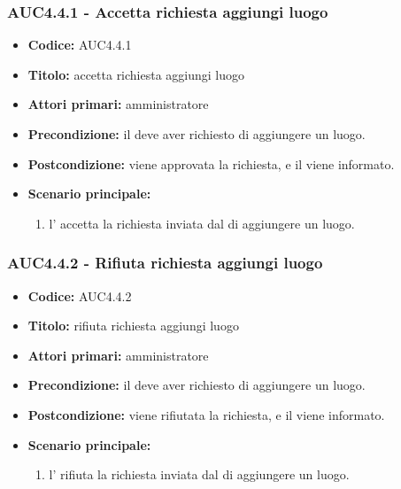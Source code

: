 \documentclass[casi-duso]{subfiles}
\begin{document}
\subsubsection{AUC4.4.1 - Accetta richiesta aggiungi luogo}%
\label{subsub:AUC4.4.1}
\begin{itemize}
  \item \textbf{Codice:} AUC4.4.1
  \item \textbf{Titolo:} accetta richiesta aggiungi luogo
  \item \textbf{Attori primari:} amministratore
  \item \textbf{Precondizione:} il  deve aver richiesto di aggiungere un luogo.
  \item \textbf{Postcondizione:} viene approvata la richiesta, e il  viene informato.
  \item \textbf{Scenario principale:}
  \begin{enumerate}
    \item  l' accetta la richiesta inviata dal  di aggiungere un luogo.
  \end{enumerate}
\end{itemize}

\subsubsection{AUC4.4.2 - Rifiuta richiesta aggiungi luogo}%
\label{subsub:AUC4.4.2}
\begin{itemize}
  \item \textbf{Codice:} AUC4.4.2
  \item \textbf{Titolo:} rifiuta richiesta aggiungi luogo
  \item \textbf{Attori primari:} amministratore
  \item \textbf{Precondizione:} il  deve aver richiesto di aggiungere un luogo.
  \item \textbf{Postcondizione:} viene rifiutata la richiesta, e il  viene informato.
  \item \textbf{Scenario principale:}
  \begin{enumerate}
    \item l' rifiuta la richiesta inviata dal  di aggiungere un luogo.
  \end{enumerate}
\end{itemize}
\end{document}
